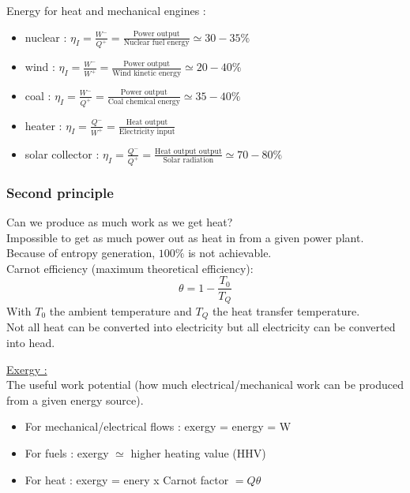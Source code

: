 \documentclass[../main.tex]{subfiles}
\begin{document}
Energy for heat and mechanical engines : \begin{itemize}
    \item nuclear : $\eta_I = \frac{W^-}{Q^+} = \frac{\text{Power output}}{\text{Nuclear fuel energy}} \simeq 30-35\%$
    \item wind : $\eta_I = \frac{W^-}{W^+} = \frac{\text{Power output}}{\text{Wind kinetic energy}} \simeq 20-40 \%$
    \item coal : $\eta_I = \frac{W^-}{Q^+} = \frac{\text{Power output}}{\text{Coal chemical energy}} \simeq 35-40\%$
    \item heater : $\eta_I = \frac{Q^-}{W^+} = \frac{\text{Heat output}}{\text{Electricity input}}$
    \item solar collector : $\eta_I = \frac{Q^-}{Q^+} = \frac{\text{Heat output output}}{\text{Solar radiation}} \simeq 70-80\%$
\end{itemize}

\subsubsection{Second principle}
Can we produce as much work as we get heat?\\

Impossible to get as much power out as heat in from a given power plant. Because of entropy generation, $100\%$ is not achievable.\\

Carnot efficiency (maximum theoretical efficiency): \begin{equation}
    \theta = 1-\frac{T_0}{T_Q}
\end{equation}
With $T_0$ the ambient temperature and $T_Q$ the heat transfer temperature. \\
Not all heat can be converted into electricity but all electricity can be converted into head. 

\quad \underline{Exergy :}\\
The useful work potential (how much electrical/mechanical work can be produced from a given energy source).\\
\begin{itemize}
    \item For mechanical/electrical flows : exergy = energy = W
    \item For fuels : exergy $\simeq$ higher heating value (HHV)
    \item For heat : exergy = enery x Carnot factor $= Q \theta$
\end{itemize}
\end{document}
